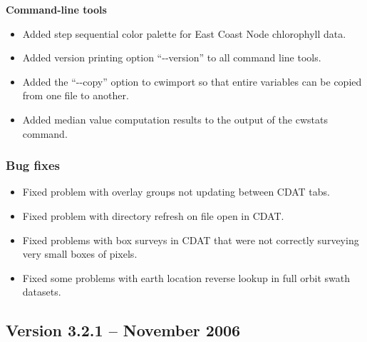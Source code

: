 \hspace{0.4cm} {\bf Command-line tools}

\begin{itemize}

  \item Added step sequential color palette for East Coast Node
  chlorophyll data.

  \item Added version printing option ``-{-}version'' to all command
  line tools.

  \item Added the ``-{-}copy'' option to cwimport so that entire
  variables can be copied from one file to another.

  \item Added median value computation results to the output of the
  cwstats command.

\end{itemize}

\subsubsection*{ Bug fixes}
\begin{itemize}

  \item Fixed problem with overlay groups not updating between CDAT
  tabs.

  \item Fixed problem with directory refresh on file open in CDAT.

  \item Fixed problems with box surveys in CDAT that were not
  correctly surveying very small boxes of pixels.

  \item Fixed some problems with earth location reverse lookup in full
  orbit swath datasets.

\end{itemize}


\subsection*{Version 3.2.1 -- November 2006}

